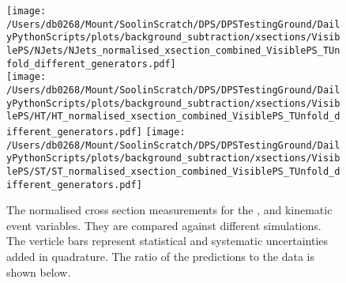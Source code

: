 \begin{figure}[hp]
	\centering
	\texttt{[image: /Users/db0268/Mount/SoolinScratch/DPS/DPSTestingGround/DailyPythonScripts/plots/background\_subtraction/xsections/VisiblePS/NJets/NJets\_normalised\_xsection\_combined\_VisiblePS\_TUnfold\_different\_generators.pdf]} \\
	\texttt{[image: /Users/db0268/Mount/SoolinScratch/DPS/DPSTestingGround/DailyPythonScripts/plots/background\_subtraction/xsections/VisiblePS/HT/HT\_normalised\_xsection\_combined\_VisiblePS\_TUnfold\_different\_generators.pdf]}
	\texttt{[image: /Users/db0268/Mount/SoolinScratch/DPS/DPSTestingGround/DailyPythonScripts/plots/background\_subtraction/xsections/VisiblePS/ST/ST\_normalised\_xsection\_combined\_VisiblePS\_TUnfold\_different\_generators.pdf]} \\
	\caption[The normalised cross section measurements for the \NJET{}, \HT{} and \ST{} kinematic event variables. They are compared against different \ttbar{} simulations. The verticle bars represent statistical and systematic uncertainties added in quadrature. The ratio of the predictions to the data is shown below.]{The normalised cross section measurements for the \NJET{}, \HT{} and \ST{} kinematic event variables. They are compared against different \ttbar{} simulations. The verticle bars represent statistical and systematic uncertainties added in quadrature. The ratio of the predictions to the data is shown below.}
	\label{fig:combXSecNorm1}
\end{figure}
